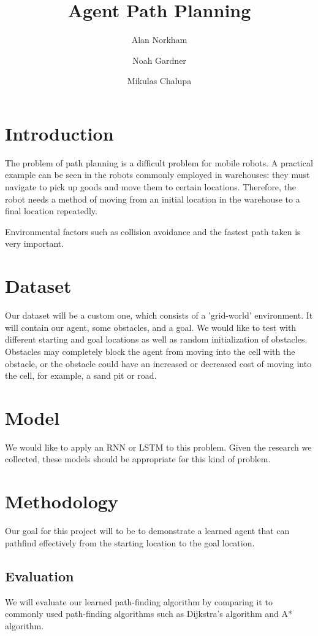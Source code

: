 \documentclass[11pt,a4paper]{article}
\title{Agent Path Planning}
\author{Alan Norkham \\
 \and Noah Gardner \\
 \and Mikulas Chalupa \\}
\date{}
\begin{document}
\maketitle

\section{Introduction}
The problem of path planning is a difficult problem for mobile robots. A
practical example can be seen in the robots commonly employed in warehouses:
they must navigate to pick up goods and move them to certain locations.
Therefore, the robot needs a method of moving from an initial location in the
warehouse to a final location repeatedly.

Environmental factors such as collision avoidance and the fastest path taken is
very important.

\section{Dataset}
Our dataset will be a custom one, which consists of a 'grid-world' environment.
It will contain our agent, some obstacles, and a goal. We would like to test
with different starting and goal locations as well as random initialization of
obstacles. Obstacles may completely block the agent from moving into the cell
with the obstacle, or the obstacle could have an increased or decreased cost of
moving into the cell, for example, a sand pit or road.

\section{Model}
We would like to apply an RNN or LSTM to this problem. Given the research we
collected, these models should be appropriate for this kind of problem.

\section{Methodology}
Our goal for this project will to be to demonstrate a learned agent that can
pathfind effectively from the starting location to the goal location.

\subsection{Evaluation}
We will evaluate our learned path-finding algorithm by comparing it to commonly
used path-finding algorithms such as Dijkstra's algorithm and A* algorithm.
\end{document}
